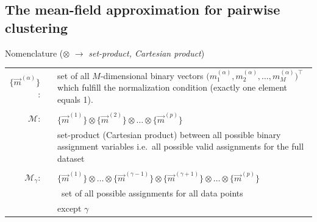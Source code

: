 \subsection{The mean-field approximation for pairwise clustering}

\begin{frame}
 Nomenclature ($\otimes$ $\rightarrow$ \emph{set-product, Cartesian product})\\
 
 \begin{tabular}{r l p{9cm}}
$\big\{ \vec{m}^{(\alpha)} \big\}$: & & set of all $M$-dimensional binary vectors $\big( m_1^{(\alpha)}, m_2^{(\alpha)}, \ldots, 
  m_M^{(\alpha)} \big)^\top$ which fulfill the normalization condition (exactly one element equals 1). \\\\
$\mathscr{M}$: & & $\big\{ \vec{m}^{(1)} \big\} \otimes \big\{ \vec{m}^{(2)} \big\} \otimes \ldots \otimes \big\{ \vec{m}^{(p)} \big\}$\\
& & set-product (Cartesian product) between all possible binary assignment variables i.e.\ all possible valid assignments for the full dataset\\\\
$\mathscr{M}_{\gamma}$:& &  $\big\{ \vec{m}^{(1)} \big\} \otimes \ldots \otimes \big\{ \vec{m}^{(\gamma - 1)} \big\} \otimes
  \big\{ \vec{m}^{(\gamma + 1)} \big\} \otimes \ldots \otimes
  \big\{ \vec{m}^{(p)} \big\}$\\
& &\  set of all possible assignments for all data points  \\& & \hspace{0.03cm} except $\gamma$
\end{tabular}

\end{frame}
